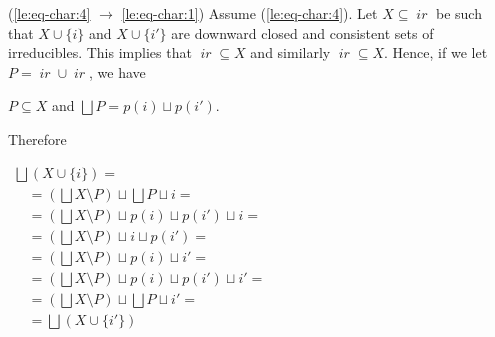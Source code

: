 \documentclass[conference]{IEEEtran}
\renewenvironment{proof}{\begin{IEEEproof}}{\end{IEEEproof}}
\newcommand{\compact}[1]{\ensuremath{\mathop{\mathsf{K}({#1})}}}
\newcommand{\ir}[1]{\ensuremath{\mathop{\mathit{ir}({#1})}}}
\newcommand{\pred}[1]{\ensuremath{\mathit{p}({#1})}}
\begin{document}
\begin{proof}
  
  \bigskip

  (\ref{le:eq-char:4} $\to$ \ref{le:eq-char:1}) Assume
  (\ref{le:eq-char:4}).  Let $X \subseteq \ir{D}$
  be such that $X \cup \{ i\}$ and $X \cup \{ i'\}$ are downward
  closed and consistent sets of irreducibles. This implies that
  $\ir{\pred{i}} \subseteq X$ and similarly
  $\ir{\pred{i'}} \subseteq X$.  Hence, if we let
  $P = \ir{\pred{i}} \cup \ir{\pred{i'}}$, we have
  \begin{center}
    $P  \subseteq X$ \quad and \quad $\bigsqcup P = \pred{i} \sqcup \pred{i'}$.
  \end{center}
  Therefore
  \begin{center}
    $
    \begin{array}{ll}
      \bigsqcup (X \cup \{ i \}) =\\
      \quad = (\bigsqcup X \setminus P) \sqcup \bigsqcup P \sqcup i =\\
      \quad = (\bigsqcup X \setminus P) \sqcup \pred{i} \sqcup \pred{i'} \sqcup i =\\
      \quad = (\bigsqcup X \setminus P) \sqcup i \sqcup \pred{i'} =\\
      \quad = (\bigsqcup X \setminus P) \sqcup \pred{i} \sqcup i' =\\
      \quad = (\bigsqcup X \setminus P) \sqcup \pred{i} \sqcup \pred{i'}  \sqcup i' =\\
      \quad = (\bigsqcup X \setminus P) \sqcup \bigsqcup P \sqcup i' =\\
      \quad = \bigsqcup (X \cup \{ i' \})
    \end{array}
    $
  \end{center}
\end{proof}
\end{document}
